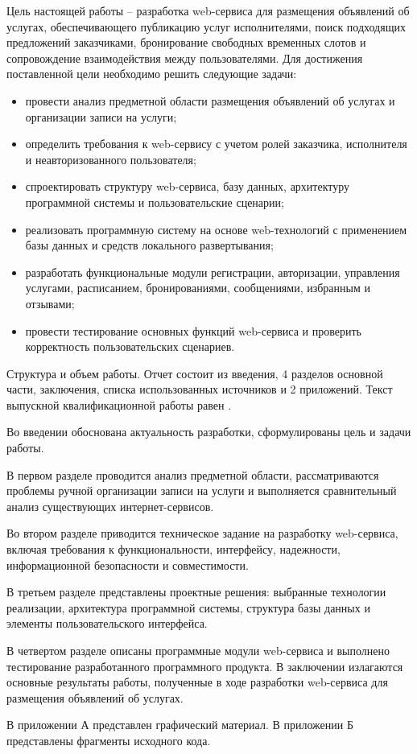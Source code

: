 Цель настоящей работы -- разработка web-сервиса для размещения объявлений об услугах, обеспечивающего публикацию услуг исполнителями, поиск подходящих предложений заказчиками, бронирование свободных временных слотов и сопровождение взаимодействия между пользователями. Для достижения поставленной цели необходимо решить следующие задачи:
\begin{itemize}
	\item провести анализ предметной области размещения объявлений об услугах и организации записи на услуги;
	\item определить требования к web-сервису с учетом ролей заказчика, исполнителя и неавторизованного пользователя;
	\item спроектировать структуру web-сервиса, базу данных, архитектуру программной системы и пользовательские сценарии;
	\item реализовать программную систему на основе web-технологий с применением базы данных и средств локального развертывания;
	\item разработать функциональные модули регистрации, авторизации, управления услугами, расписанием, бронированиями, сообщениями, избранным и отзывами;
	\item провести тестирование основных функций web-сервиса и проверить корректность пользовательских сценариев.
\end{itemize}

Структура и объем работы. Отчет состоит из введения, 4 разделов основной части, заключения, списка использованных источников и 2 приложений. Текст выпускной квалификационной работы равен .

Во введении обоснована актуальность разработки, сформулированы цель и задачи работы. 

В первом разделе проводится анализ предметной области, рассматриваются проблемы ручной организации записи на услуги и выполняется сравнительный анализ существующих интернет-сервисов. 

Во втором разделе приводится техническое задание на разработку web-сервиса, включая требования к функциональности, интерфейсу, надежности, информационной безопасности и совместимости. 

В третьем разделе представлены проектные решения: выбранные технологии реализации, архитектура программной системы, структура базы данных и элементы пользовательского интерфейса. 

В четвертом разделе описаны программные модули web-сервиса и выполнено тестирование разработанного программного продукта.
В заключении излагаются основные результаты работы, полученные в ходе разработки web-сервиса для размещения объявлений об услугах.

В приложении А представлен графический материал.
В приложении Б представлены фрагменты исходного кода.
